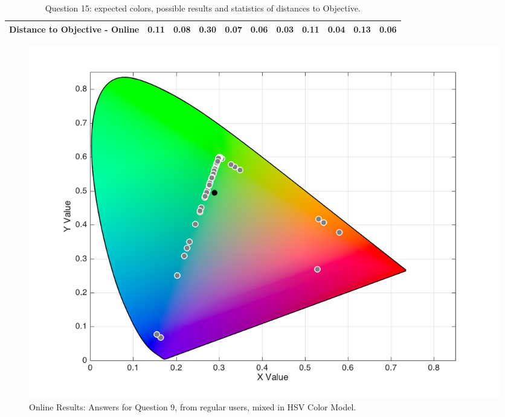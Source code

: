 \begin{table}[H]
{\begin{tabular}{lccccccccccccc}
    \multicolumn{4}{l}{Distance to Objective - Online}                                                                                               & \multicolumn{1}{|c}{0.11}        & \multicolumn{1}{c|}{0.08}    & \multicolumn{1}{|c}{0.30}        & \multicolumn{1}{c|}{0.07}    & \multicolumn{1}{|c}{\textbf{0.06}}       & \multicolumn{1}{c|}{0.03}    & \multicolumn{1}{|c}{0.11}        & \multicolumn{1}{c|}{0.04}    & \multicolumn{1}{|c}{0.13}       & \multicolumn{1}{c|}{0.06}    \\ \hline
    \end{tabular}}
  \caption[Question 15, with expected Results.]{Question 15: expected colors, possible results and statistics of distances to Objective.}
  \label{table:lab_q15_expected}
\end{table}
%
\begin{figure}[htbp]
  \centering
  \begin{minipage}{0.48\textwidth}
    \centering
    \includegraphics[width=\textwidth]{images/results/9_online_HSVresponses.png}
    \caption[Online Results: Answers for Question 9, from regular users, mixed in HSV Color Model.]{Online Results: Answers for Question 9, from regular users, mixed in HSV Color Model.}
    \label{fig:onlinehsvregular_9}
  \end{minipage}\hfill
  \begin{minipage}{0.48\textwidth}
    \centering

\end{minipage}
\end{figure}
